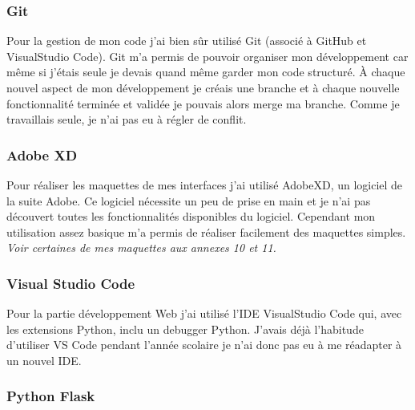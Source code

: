\documentclass[12pt]{article}
\begin{document}
\subsubsection{Git}
Pour la gestion de mon code j'ai bien sûr utilisé Git (associé à GitHub et VisualStudio Code). Git m'a permis de pouvoir organiser mon développement  car même si j'étais seule je devais quand même garder mon code structuré. À chaque nouvel aspect de mon développement je créais une branche et à chaque nouvelle fonctionnalité terminée et validée je pouvais alors merge ma branche. Comme je travaillais seule, je n'ai pas eu à régler de conflit. 

\subsubsection{Adobe XD}
Pour réaliser les maquettes de mes interfaces j'ai utilisé AdobeXD, un logiciel de la suite Adobe. Ce logiciel nécessite un peu de prise en main et je n'ai pas découvert toutes les fonctionnalités disponibles du logiciel. Cependant mon utilisation assez basique m'a permis de réaliser facilement des maquettes simples. \textit{Voir certaines de mes maquettes aux annexes 10 et 11.}


\subsubsection{Visual Studio Code}
Pour la partie développement Web j'ai utilisé l'IDE  VisualStudio Code qui, avec les extensions Python, inclu un debugger Python. J'avais déjà l'habitude d'utiliser VS Code pendant l'année scolaire je n'ai donc pas eu à me réadapter à un nouvel IDE.

\subsubsection{Python Flask}
\end{document}
